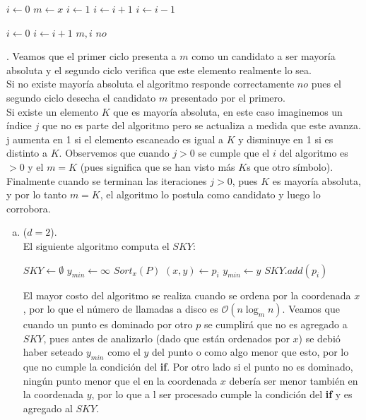 \documentclass[dcc,uchile]{fcfmcourse}
\begin{document}
\begin{problems}
\begin{algorithmic}
\STATE $i\gets 0$
        \STATE $m\gets x$
        \STATE $i\gets 1$        
\ELSE
                \STATE $i\gets i+1$
        \ELSE
                \STATE $i\gets i-1$
        \ENDIF
\ENDIF 
\ENDFOR
\end{algorithmic}
\begin{algorithmic}
\STATE $i\gets 0$
            \STATE $i\gets i+1$
    \ENDIF
\ENDFOR
{}
            \RETURN $m,i$
\ELSE 
            \RETURN $no$
\ENDIF
\end{algorithmic}
\magic \magic. Veamos que el primer ciclo presenta a $m$ como un candidato a ser mayoría absoluta y el segundo ciclo verifica que este elemento realmente lo sea.\\
Si no existe mayoría absoluta el algoritmo responde correctamente $no$ pues el segundo ciclo desecha el candidato $m$ presentado por el primero.\\
Si existe un elemento $K$ que es mayoría absoluta, en este caso imaginemos un índice $j$ que no es parte del algoritmo pero se actualiza a medida que este avanza. j aumenta en 1 si el elemento escaneado es igual a $K$ y disminuye en 1 si es distinto a $K$. Observemos que cuando $j>0$ se cumple que el $i$ del algoritmo es $>0$ y el $m=K$ (pues significa que se han visto más $K$s que otro símbolo). Finalmente cuando se terminan las iteraciones $j>0$, pues $K$ es mayoría absoluta, y por lo tanto $m=K$, el algoritmo lo postula como candidato y luego lo corrobora.
\\
\begin{enumerate}[a)]
    \item ($d=2$).\\
    El siguiente algoritmo computa el $SKY$:
    \begin{algorithmic}
    \STATE $SKY \gets \emptyset$
    \STATE $y_{min} \gets \infty$
    \STATE $Sort_{x}(P)$
        \STATE $(x,y) \gets p_{i}$
            \STATE $y_{min} \gets y$
            \STATE $SKY.add(p_{i})$
        \ENDIF
    \ENDFOR
    \end{algorithmic}
    El mayor costo del algoritmo se realiza cuando se ordena por la coordenada $x$, por lo que el número de llamadas a disco es $\mathcal{O}(n\log_{m}n)$. Veamos que cuando un punto es dominado por otro $p$ se cumplirá que no es agregado a $SKY$, pues antes de analizarlo (dado que están ordenados por $x$) se debió haber seteado $y_{min}$ como el $y$ del punto o como algo menor que esto, por lo que no cumple la condición del \textbf{if}. Por otro lado si el punto no es dominado, ningún punto menor que el en la coordenada $x$ debería ser menor también en la coordenada $y$, por lo que a l ser procesado cumple la condición del \textbf{if} y es agregado al $SKY$.
    

\end{enumerate}
\end{problems}
\end{document}
